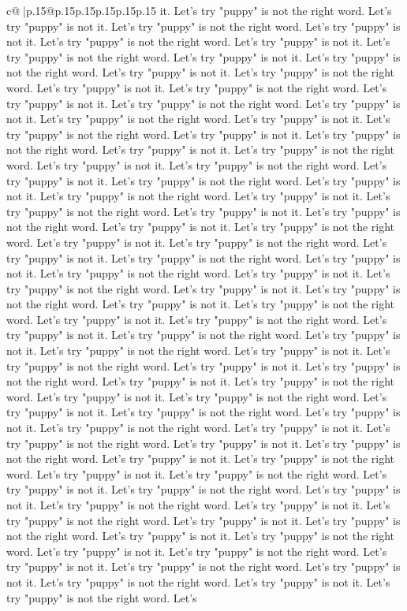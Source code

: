 \documentclass{article}
\begin{document}
{\begin{supertabular}{c@{$\;$}|p{.15\linewidth}@{}p{.15\linewidth}p{.15\linewidth}p{.15\linewidth}p{.15\linewidth}p{.15\linewidth}}
{{{it. Let's try "puppy" is not the right word. Let's try "puppy" is not it. Let's try "puppy" is not the right word. Let's try "puppy" is not it. Let's try "puppy" is not the right word. Let's try "puppy" is not it. Let's try "puppy" is not the right word. Let's try "puppy" is not it. Let's try "puppy" is not the right word. Let's try "puppy" is not it. Let's try "puppy" is not the right word. Let's try "puppy" is not it. Let's try "puppy" is not the right word. Let's try "puppy" is not it. Let's try "puppy" is not the right word. Let's try "puppy" is not it. Let's try "puppy" is not the right word. Let's try "puppy" is not it. Let's try "puppy" is not the right word. Let's try "puppy" is not it. Let's try "puppy" is not the right word. Let's try "puppy" is not it. Let's try "puppy" is not the right word. Let's try "puppy" is not it. Let's try "puppy" is not the right word. Let's try "puppy" is not it. Let's try "puppy" is not the right word. Let's try "puppy" is not it. Let's try "puppy" is not the right word. Let's try "puppy" is not it. Let's try "puppy" is not the right word. Let's try "puppy" is not it. Let's try "puppy" is not the right word. Let's try "puppy" is not it. Let's try "puppy" is not the right word. Let's try "puppy" is not it. Let's try "puppy" is not the right word. Let's try "puppy" is not it. Let's try "puppy" is not the right word. Let's try "puppy" is not it. Let's try "puppy" is not the right word. Let's try "puppy" is not it. Let's try "puppy" is not the right word. Let's try "puppy" is not it. Let's try "puppy" is not the right word. Let's try "puppy" is not it. Let's try "puppy" is not the right word. Let's try "puppy" is not it. Let's try "puppy" is not the right word. Let's try "puppy" is not it. Let's try "puppy" is not the right word. Let's try "puppy" is not it. Let's try "puppy" is not the right word. Let's try "puppy" is not it. Let's try "puppy" is not the right word. Let's try "puppy" is not it. Let's try "puppy" is not the right word. Let's try "puppy" is not it. Let's try "puppy" is not the right word. Let's try "puppy" is not it. Let's try "puppy" is not the right word. Let's try "puppy" is not it. Let's try "puppy" is not the right word. Let's try "puppy" is not it. Let's try "puppy" is not the right word. Let's try "puppy" is not it. Let's try "puppy" is not the right word. Let's try "puppy" is not it. Let's try "puppy" is not the right word. Let's try "puppy" is not it. Let's try "puppy" is not the right word. Let's try "puppy" is not it. Let's try "puppy" is not the right word. Let's try "puppy" is not it. Let's try "puppy" is not the right word. Let's try "puppy" is not it. Let's try "puppy" is not the right word. Let's try "puppy" is not it. Let's try "puppy" is not the right word. Let's try "puppy" is not it. Let's try "puppy" is not the right word. Let's try "puppy" is not it. Let's try "puppy" is not the right word. Let's try "puppy" is not it. Let's try "puppy" is not the right word. Let's try "puppy" is not it. Let's try "puppy" is not the right word. Let's try "puppy" is not it. Let's try "puppy" is not the right word. Let's try "puppy" is not it. Let's try "puppy" is not the right word. Let's }}}
\end{supertabular}}
\end{document}
